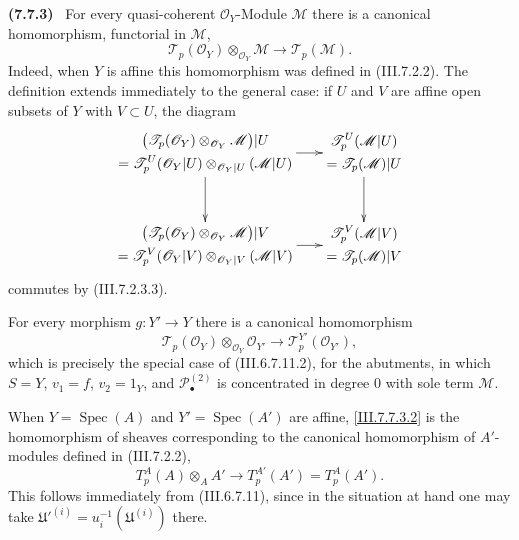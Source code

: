 \documentclass[10pt,oneside]{book}
\newcommand{\sh}[1]{\mathscr{#1}}
\newcommand{\Spec}{\operatorname{Spec}}
\newcommand{\sref}[2][]{(#2)}
\newcommand{\oldpage}[2][]{\setcounter{footnote}{0}\marginpar{\scriptsize\textbf{#1}~|~#2}\ignorespaces}
\newenvironment{env}[1][]{\par\medskip\noindent\textbf{(#1)}\ }{\par}
\begin{document}
\begin{env}[7.7.3]
\label{III.7.7.3}
For every quasi-coherent $\sh{O}_Y$-Module $\sh{M}$ there is
a canonical homomorphism, functorial in $\sh{M}$,
\[
  \sh{T}_p(\sh{O}_Y)
  \otimes_{\sh{O}_Y}\sh{M}
  \longrightarrow
  \sh{T}_p(\sh{M}).
  \tag{7.7.3.1}\label{III.7.7.3.1}
\]
Indeed, when $Y$ is affine this homomorphism was defined in
\sref{III.7.2.2}.  The definition extends immediately to
the general case: if $U$ and $V$ are affine open subsets of
$Y$ with $V\subset U$, the diagram
\oldpage[III]{199}
\[
\xymatrix@C=18pt@R=32pt{
  {\begin{gathered}
    \bigl(\sh{T}_p(\sh{O}_Y)
      \otimes_{\sh{O}_Y}\sh{M}\bigr)|U\\
    =
    \sh{T}^U_p(\sh{O}_Y|U)
      \otimes_{\sh{O}_Y|U}(\sh{M}|U)
  \end{gathered}}
  \ar[r]\ar[d]
  &
  {\begin{gathered}
    \sh{T}^U_p(\sh{M}|U)\\
    =\sh{T}_p(\sh{M})|U
  \end{gathered}}
  \ar[d]
  \\
  {\begin{gathered}
    \bigl(\sh{T}_p(\sh{O}_Y)
      \otimes_{\sh{O}_Y}\sh{M}\bigr)|V\\
    =
    \sh{T}^V_p(\sh{O}_Y|V)
      \otimes_{\sh{O}_Y|V}(\sh{M}|V)
  \end{gathered}}
  \ar[r]
  &
  {\begin{gathered}
    \sh{T}^V_p(\sh{M}|V)\\
    =\sh{T}_p(\sh{M})|V
  \end{gathered}}
}
\]
commutes by \sref{III.7.2.3.3}.

For every morphism $g:Y'\to Y$ there is a canonical
homomorphism
\[
  \sh{T}_p(\sh{O}_Y)
  \otimes_{\sh{O}_Y}\sh{O}_{Y'}
  \longrightarrow
  \sh{T}^{Y'}_p(\sh{O}_{Y'}),
  \tag{7.7.3.2}\label{III.7.7.3.2}
\]
which is precisely the special case of
\sref{III.6.7.11.2}, for the abutments, in which
$S=Y$, $v_1=f$, $v_2=1_Y$, and
$\sh{P}^{(2)}_\bullet$ is concentrated in degree $0$ with
sole term $\sh{M}$.

When $Y=\Spec(A)$ and $Y'=\Spec(A')$ are affine,
\eqref{III.7.7.3.2} is the homomorphism of sheaves
corresponding to the canonical homomorphism of $A'$-modules
defined in \sref{III.7.2.2},
\[
  T^A_p(A)\otimes_A A'
  \longrightarrow
  T^{A'}_p(A')
  =
  T^A_p(A').
\]
This follows immediately from \sref{III.6.7.11}, since in
the situation at hand one may take
$\mathfrak U'^{(i)}=u_i^{-1}(\mathfrak U^{(i)})$ there.
\end{env}
\end{document}
